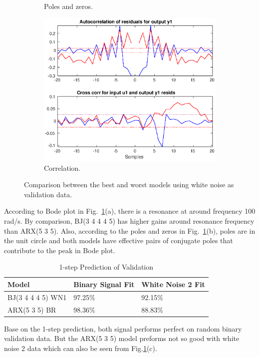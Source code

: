 \documentclass[10pt,a4paper]{article}
\begin{document}
\begin{figure}[ht]
\begin{subfigure}[t]{.32\linewidth}
		\caption{Poles and zeros.}
		\end{subfigure}
		\begin{subfigure}[t]{.32\linewidth}
		\centering\includegraphics[width=\linewidth]{whiteNoiseResiduals.eps}
		\caption{Correlation.}
  		\end{subfigure}
  		\caption{Comparison between the best and worst models using white noise as validation data.}
  		\label{fig:whiteNoiseCompare}
  	\end{figure}
\par According to Bode plot in Fig.~\ref{fig:whiteNoiseCompare}(a), there is a resonance at around frequency 100 rad/s. By comparison, BJ(3 4 4 4 5) has higher gains around resonance frequency than ARX(5 3 5). Also, according to the poles and zeros in Fig.~\ref{fig:whiteNoiseCompare}(b), poles are in the unit circle and both models have effective pairs of conjugate poles that contribute to the peak in Bode plot.
	\begin{table}[ht]
		\footnotesize
		\centering
		\caption{1-step Prediction of Validation}
		\label{table:whiteNoiseValidation}
		\begin{tabular}{lll}
			\hline
			Model & Binary Signal Fit & \textbf{White Noise 2 Fit} \\
			\hline
			BJ(3 4 4 4 5) WN1 & 97.25\% & 92.15\% \\
			ARX(5 3 5) BR & 98.36\% & 88.83\% \\
			\hline
		\end{tabular}
	\end{table}
\par Base on the 1-step prediction, both signal performs perfect on random binary validation data. But the ARX(5 3 5) model preforms not so good with white noise 2 data which can also be seen from Fig.\ref{fig:whiteNoiseCompare}(c).
\end{document}

